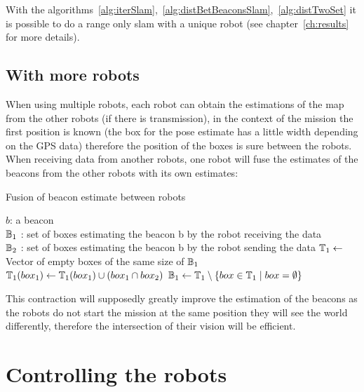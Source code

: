 With the algorithms~\ref{alg:iterSlam},~\ref{alg:distBetBeaconsSlam},~\ref{alg:distTwoSet} it is possible to do a range only slam with a unique robot (see chapter~\ref{ch:results} for more details).

\subsection{With more robots}

When using multiple robots, each robot can obtain the estimations of the map from the other robots (if there is transmission), in the context of the mission the first position is known (the box for the pose estimate has a little width depending on the GPS data) therefore the position of the boxes is sure between the robots. When receiving data from another robots, one robot will fuse the estimates of the beacons from the other robots with its own estimates:

\begin{algorithm}[H]
\caption{Fusion of beacon estimate between robots}
\label{alg:fuseDataRobotSet}
\begin{algorithmic}[1]
\REQUIRE $b$: a beacon\\
   $\mathbb{B_{\textnormal{1}}}$ : set of boxes estimating the beacon b by the robot receiving the data\\
   $\mathbb{B_{\textnormal{2}}}$ : set of boxes estimating the beacon b by the robot sending the data
\STATE $\mathbb{T_{\textnormal{1}}} \leftarrow$ Vector of empty boxes of the same size of $\mathbb{B_{\textnormal{1}}}$
\STATE $\mathbb{T_{\textnormal{1}}}(box_1) \leftarrow  \mathbb{T_{\textnormal{1}}}(box_1)  \cup (box_{1} \cap box_{2})$
\ENDFOR
\ENDFOR
\STATE $\mathbb{B_{\textnormal{1}}} \leftarrow \mathbb{T_{\textnormal{1}}}\setminus\{box \in \mathbb{T_{\textnormal{1}}} \mid box = \emptyset \}$
\end{algorithmic}
\end{algorithm}

This contraction will supposedly greatly improve the estimation of the beacons as the robots do not start the mission at the same position they will see the world differently, therefore the intersection of their vision will be efficient.

\section{Controlling the robots}

